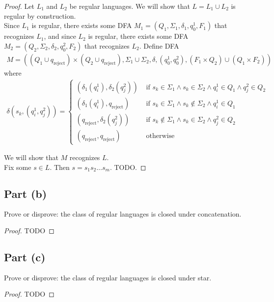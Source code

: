 \documentclass{article}
\begin{document}
\begin{proof}
    Let $L_1$ and $L_2$ be regular languages. We will show that $L = L_1 \cup L_2$ is regular by construction. \\
    
    \noindent
    Since $L_1$ is regular, there exists some DFA $M_1 = (Q_1, \Sigma_1, \delta_1, q_{0}^1, F_1)$ that recognizes $L_1$, and since $L_2$ is regular, there 
    exists some DFA $M_2 = (Q_2, \Sigma_2, \delta_2, q_{0}^2, F_2)$ that recognizes $L_2$. Define DFA 
    \begin{align*}
        M = ((Q_1 \cup q_{\text{reject}}) \times (Q_2 \cup q_{\text{reject}}), \Sigma_1 \cup \Sigma_2, \delta, (q_{0}^1, q_{0}^2), (F_1 \times Q_2) \cup (Q_1 \times F_2))
    \end{align*}
    where
    \begin{align*}
        \delta(s_k, (q_i^1, q_j^2)) = \begin{cases}
            (\delta_1(q_i^1), \delta_2(q_j^2)) & \text{ if } s_k \in \Sigma_1 \land s_k \in \Sigma_2 \land q_i^1 \in Q_1 \land q_j^2 \in Q_2 \\
            (\delta_1(q_i^1), q_{\text{reject}}) & \text{ if } s_k \in \Sigma_1 \land s_k \not \in \Sigma_2 \land q_i^1 \in Q_1 \\
            (q_{\text{reject}}, \delta_2(q_j^2)) & \text{ if } s_k \not \in \Sigma_1 \land s_k \in \Sigma_2 \land q_j^2 \in Q_2 \\
            (q_{\text{reject}}, q_{\text{reject}}) & \text{ otherwise}
        \end{cases}
    \end{align*}

    \noindent
    We will show that $M$ recognizes $L$. \\ 
    
    \noindent
    Fix some $s \in L$. Then $s = s_1 s_2 \ldots s_m$. TODO.
\end{proof}

\subsection*{Part (b)}

Prove or disprove: the class of regular languages is closed under concatenation.

\begin{proof}
    TODO
\end{proof}

\subsection*{Part (c)}

Prove or disprove: the class of regular languages is closed under star.

\begin{proof}
    TODO
\end{proof}
\end{document}
